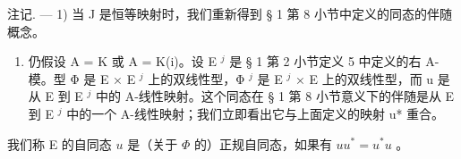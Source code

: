 注记. --- 1) 当 J 是恒等映射时，我们重新得到 § 1 第 8 小节中定义的同态的伴随概念。

\begin{enumerate}
\def\labelenumi{\arabic{enumi})}
\setcounter{enumi}{1}
\tightlist
\item
  仍假设 A = K 或 A = K(i)。设 E \(^{j}\) 是 § 1 第 2 小节定义 5 中定义的右 A-模。型 Φ 是 E × E \(^{j}\) 上的双线性型，Φ \(^{j}\) 是 E \(^{j}\) × E 上的双线性型，而 u 是从 E 到 E \(^{j}\) 中的 A-线性映射。这个同态在 § 1 第 8 小节意义下的伴随是从 E 到 E \(^{j}\) 中的一个 A-线性映射；我们立即看出它与上面定义的映射 u* 重合。
\end{enumerate}

我们称 E 的自同态 \(u\) 是（关于 \(\Phi\) 的）正规自同态，如果有 \(uu^{*}=u^{*}u\) 。
